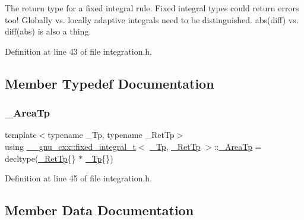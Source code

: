 The return type for a fixed integral rule. Fixed integral types could return errors too! Globally vs. locally adaptive integrals need to be distinguished. abs(diff) vs. diff(abs) is also a thing. 

Definition at line 43 of file integration.\+h.



\subsection{Member Typedef Documentation}
\mbox{\label{struct____gnu__cxx_1_1fixed__integral__t_a68a11ba646968b5cebfc4cc7c1547478}} 
\subsubsection{\texorpdfstring{\+\_\+\+Area\+Tp}{\_AreaTp}}
{\footnotesize\ttfamily template$<$typename \+\_\+\+Tp, typename \+\_\+\+Ret\+Tp$>$ \\
using \hyperlink{struct____gnu__cxx_1_1fixed__integral__t}{\+\_\+\+\_\+gnu\+\_\+cxx\+::fixed\+\_\+integral\+\_\+t}$<$ \hyperlink{namespace____gnu__cxx_a3b19a9c800ca194374ef9172290f7d79}{\+\_\+\+Tp}, \hyperlink{namespace____gnu__cxx_a886e03ece3d53ff7fa6c098a40f93fa5}{\+\_\+\+Ret\+Tp} $>$\+::\hyperlink{struct____gnu__cxx_1_1fixed__integral__t_a68a11ba646968b5cebfc4cc7c1547478}{\+\_\+\+Area\+Tp} =  decltype(\hyperlink{namespace____gnu__cxx_a886e03ece3d53ff7fa6c098a40f93fa5}{\+\_\+\+Ret\+Tp}\{\} $\ast$ \hyperlink{namespace____gnu__cxx_a3b19a9c800ca194374ef9172290f7d79}{\+\_\+\+Tp}\{\})}



Definition at line 45 of file integration.\+h.



\subsection{Member Data Documentation}
\mbox{\label{struct____gnu__cxx_1_1fixed__integral__t_a9d52eafc8db2db186dee1587be02d7bd}} 
